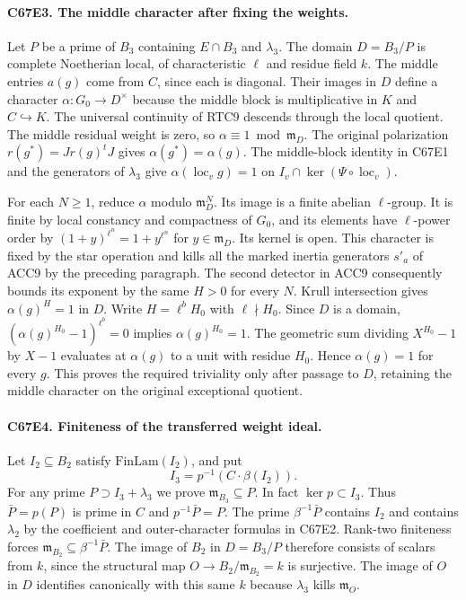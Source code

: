 \paragraph{C67E3. The middle character after fixing the weights.}
Let $P$ be a prime of $B_3$ containing $E\cap B_3$ and
$\lambda_3$. The domain $D=B_3/P$ is complete Noetherian local,
of characteristic $\ell$ and residue field $k$. The middle entries
$a(g)$ come from $C$, since each is diagonal. Their images in $D$
define a character $\alpha:G_0\to D^\times$ because the middle
block is multiplicative in $K$ and $C\hookrightarrow K$.
The universal continuity of RTC9 descends through the local quotient.
The middle residual weight is zero, so $\alpha\equiv1\bmod\mathfrak m_D$.
The original polarization $r(g^*)=Jr(g)^tJ$ gives
$\alpha(g^*)=\alpha(g)$. The middle-block identity in C67E1 and
the generators of $\lambda_3$ give $\alpha(\operatorname{loc}_v g)=1$
on $I_v\cap\ker(\Psi\circ\operatorname{loc}_v)$.

For each $N\ge1$, reduce $\alpha$ modulo $\mathfrak m_D^N$. Its image
is a finite abelian $\ell$-group. It is finite by local constancy
and compactness of $G_0$, and its elements have $\ell$-power order
by $(1+y)^{\ell^n}=1+y^{\ell^n}$ for $y\in\mathfrak m_D$.
Its kernel is open. This character is fixed by the star operation
and kills all the marked inertia generators $s'_a$ of ACC9 by the
preceding paragraph. The second detector in ACC9 consequently
bounds its exponent by the same $H>0$ for every $N$.
Krull intersection gives $\alpha(g)^H=1$ in $D$. Write
$H=\ell^bH_0$ with $\ell\nmid H_0$. Since $D$ is a domain,
$(\alpha(g)^{H_0}-1)^{\ell^b}=0$ implies $\alpha(g)^{H_0}=1$.
The geometric sum dividing $X^{H_0}-1$ by $X-1$ evaluates at
$\alpha(g)$ to a unit with residue $H_0$. Hence $\alpha(g)=1$
for every $g$. This proves the required triviality only after passage
to $D$, retaining the middle character on the original exceptional
quotient.

\paragraph{C67E4. Finiteness of the transferred weight ideal.}
Let $I_2\subseteq B_2$ satisfy $\mathrm{FinLam}(I_2)$, and put
\[
                I_3=p^{-1}\!\left(C\cdot\beta(I_2)\right).
\]
For any prime $P\supset I_3+\lambda_3$ we prove
$\mathfrak m_{B_3}\subseteq P$. In fact $\ker p\subset I_3$.
Thus $\bar P=p(P)$ is prime in $C$ and $p^{-1}\bar P=P$.
The prime $\beta^{-1}\bar P$ contains $I_2$ and contains $\lambda_2$
by the coefficient and outer-character formulas in C67E2.
Rank-two finiteness forces $\mathfrak m_{B_2}\subseteq\beta^{-1}\bar P$.
The image of $B_2$ in $D=B_3/P$ therefore consists of scalars from
$k$, since the structural map $O\to B_2/\mathfrak m_{B_2}=k$
is surjective. The image of $O$ in $D$ identifies canonically with
this same $k$ because $\lambda_3$ kills $\mathfrak m_O$.

